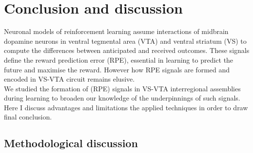 \chapter{Conclusion and discussion}
\label{chap:Conclusion}
Neuronal models of reinforcement learning assume interactions of midbrain dopamine neurons in ventral tegmental area (VTA) and ventral striatum (VS) to compute the differences between anticipated and received outcomes. These signals define the reward prediction error (RPE), essential in learning to predict the future and maximise the reward. However how RPE signals are formed and encoded in VS-VTA circuit remains elusive.\\We studied the formation of (RPE) signals in VS-VTA interregional assemblies during learning to broaden our knowledge of the underpinnings of such signals. Here I discuss advantages and limitations the applied techniques in order to draw final conclusion.
\section{Methodological discussion}
